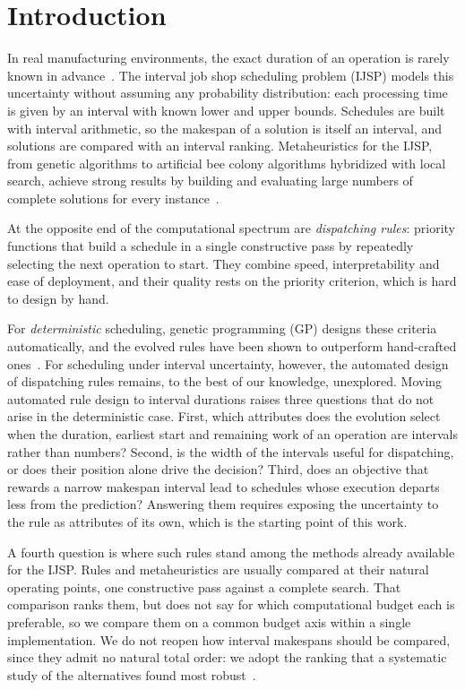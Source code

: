 \documentclass[review,authoryear,11pt]{elsarticle}
\begin{document}
\section{Introduction}
\label{sec:intro}

In real manufacturing environments, the exact duration of an operation
is rarely known in advance~\citep{Allahverdi2022}. The interval job shop
scheduling problem (IJSP) models this uncertainty without assuming any
probability distribution: each processing time is given by an interval
with known lower and upper bounds. Schedules are built with interval
arithmetic, so the makespan of a solution is itself an interval, and
solutions are compared with an interval ranking. Metaheuristics for the
IJSP, from genetic algorithms to artificial bee colony algorithms
hybridized with local search, achieve strong results by building and
evaluating large numbers of complete solutions for every
instance~\citep{DiazGA2020,DiazABC2022,DiazFEABC2023,DiazICAE2023}.

At the opposite end of the computational spectrum are \emph{dispatching
rules}: priority functions that build a schedule in a single constructive
pass by repeatedly selecting the next operation to start. They combine
speed, interpretability and ease of deployment, and their quality rests
on the priority criterion, which is hard to design by hand.

For \emph{deterministic} scheduling, genetic programming (GP) designs
these criteria automatically, and the evolved rules have been shown to
outperform hand-crafted ones~\citep{Branke2016,Nguyen2017}. For
scheduling under interval uncertainty, however, the automated design of
dispatching rules remains, to the best of our knowledge, unexplored.
Moving automated rule design to interval durations raises three
questions that do not arise in the deterministic case. First, which
attributes does the evolution select when the duration, earliest start
and remaining work of an operation are intervals rather than numbers?
Second, is the width of the intervals useful for dispatching, or does
their position alone drive the decision? Third, does an objective that
rewards a narrow makespan interval lead to schedules whose execution
departs less from the prediction? Answering them requires exposing the
uncertainty to the rule as attributes of its own, which is the starting
point of this work.

A fourth question is where such rules stand among the methods already
available for the IJSP. Rules and metaheuristics are usually compared at
their natural operating points, one constructive pass against a complete
search. That comparison ranks them, but does not say for which
computational budget each is preferable, so we compare them on a common
budget axis within a single implementation. We do not reopen how
interval makespans should be compared, since they admit no natural total
order: we adopt the ranking that a systematic study of the alternatives
found most robust~\citep{DiazGA2020}.
\end{document}
